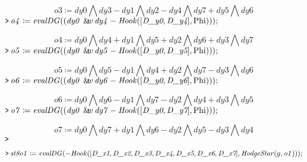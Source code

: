 \documentclass{article}
\begin{document}
\begin{dmath}\label{(13)}
\mathit{o3} \coloneqq \mathit{dy0} \bigwedge  \mathit{dy3} -\mathit{dy1} \bigwedge  \mathit{dy2} -\mathit{dy4} \bigwedge  \mathit{dy7} +\mathit{dy5} \bigwedge  \mathit{dy6} 
\end{dmath}
\mapleinput
{$ \displaystyle \texttt{>\,} \mathit{o4} \coloneqq \mathit{evalDG} ((\mathit{dy0} \,\:\&\!\!w \,\mathit{dy4} -\mathit{Hook} ([\textit{D\_y0} ,\textit{D\_y4}],\mathrm{Phi})));\, $}

\begin{dmath}\label{(14)}
\mathit{o4} \coloneqq \mathit{dy0} \bigwedge  \mathit{dy4} +\mathit{dy1} \bigwedge  \mathit{dy5} +\mathit{dy2} \bigwedge  \mathit{dy6} +\mathit{dy3} \bigwedge  \mathit{dy7} 
\end{dmath}
\mapleinput
{$ \displaystyle \texttt{>\,} \mathit{o5} \coloneqq \mathit{evalDG} ((\mathit{dy0} \,\:\&\!\!w \,\mathit{dy5} -\mathit{Hook} ([\textit{D\_y0} ,\textit{D\_y5}],\mathrm{Phi})));\, $}

\begin{dmath}\label{(15)}
\mathit{o5} \coloneqq \mathit{dy0} \bigwedge  \mathit{dy5} -\mathit{dy1} \bigwedge  \mathit{dy4} +\mathit{dy2} \bigwedge  \mathit{dy7} -\mathit{dy3} \bigwedge  \mathit{dy6} 
\end{dmath}
\mapleinput
{$ \displaystyle \texttt{>\,} \mathit{o6} \coloneqq \mathit{evalDG} ((\mathit{dy0} \,\:\&\!\!w \,\mathit{dy6} -\mathit{Hook} ([\textit{D\_y0} ,\textit{D\_y6}],\mathrm{Phi})));\, $}

\begin{dmath}\label{(16)}
\mathit{o6} \coloneqq \mathit{dy0} \bigwedge  \mathit{dy6} -\mathit{dy1} \bigwedge  \mathit{dy7} -\mathit{dy2} \bigwedge  \mathit{dy4} +\mathit{dy3} \bigwedge  \mathit{dy5} 
\end{dmath}
\mapleinput
{$ \displaystyle \texttt{>\,} \mathit{o7} \coloneqq \mathit{evalDG} ((\mathit{dy0} \,\:\&\!\!w \,\mathit{dy7} -\mathit{Hook} ([\textit{D\_y0} ,\textit{D\_y7}],\mathrm{Phi})));\, $}

\begin{dmath}\label{(17)}
\mathit{o7} \coloneqq \mathit{dy0} \bigwedge  \mathit{dy7} +\mathit{dy1} \bigwedge  \mathit{dy6} -\mathit{dy2} \bigwedge  \mathit{dy5} -\mathit{dy3} \bigwedge  \mathit{dy4} 
\end{dmath}
\mapleinput
{$ \displaystyle \texttt{>\,} \, $}

\mapleinput
{$ \displaystyle \texttt{>\,} \mathit{st8o1} \coloneqq \mathit{evalDG} (-\mathit{Hook} ([\textit{D\_x1} ,\textit{D\_x2} ,\textit{D\_x3} ,\textit{D\_x4} ,\textit{D\_x5} ,\textit{D\_x6} ,\textit{D\_x7}],\mathit{HodgeStar} (g ,\mathit{o1}))); $}
\end{document}
